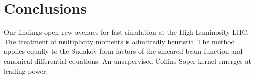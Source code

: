 \section{Conclusions}\label{sec:conclusions}

Our findings open new avenues for fast simulation at the High-Luminosity
LHC. The treatment of multiplicity moments is admittedly heuristic. The
method applies equally to the Sudakov form factors of the smeared beam
function and canonical differential equations. An unsupervised
Collins-Soper kernel emerges at leading power.

